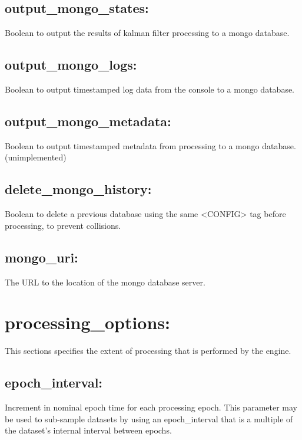 \subsection*{output\_mongo\_states:}
Boolean to output the results of kalman filter processing to a mongo database.

\subsection*{output\_mongo\_logs:}
Boolean to output timestamped log data from the console to a mongo database.

\subsection*{output\_mongo\_metadata:}
Boolean to output timestamped metadata from processing to a mongo database. (unimplemented)

\subsection*{delete\_mongo\_history:}
Boolean to delete a previous database using the same <CONFIG> tag before processing, to prevent collisions.

\subsection*{mongo\_uri:}
The URL to the location of the mongo database server.



















\section{processing\_options:}

This sections specifies the extent of processing that is performed by the engine.

\subsection*{epoch\_interval:}
Increment in nominal epoch time for each processing epoch. This parameter may be used to sub-sample datasets by using an epoch\_interval that is a multiple of the dataset's internal interval between epochs.

